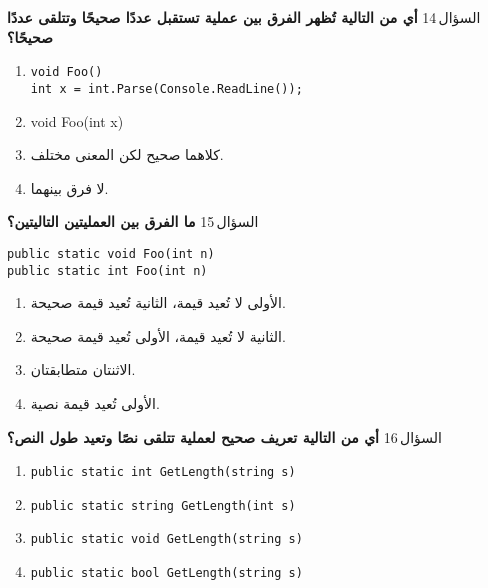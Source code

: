 \documentclass[13pt]{beamer}
\begin{document}
\begin{frame}[fragile]{السؤال\,14}
\textbf{أي من التالية تُظهر الفرق بين عملية \textbf{تستقبل} عددًا صحيحًا و\textbf{تتلقى} عددًا صحيحًا؟}

\begin{enumerate}[label=(\alph*)]
  \item
  \begin{english}
    \begin{lstlisting}[language=CSharp]
void Foo()
int x = int.Parse(Console.ReadLine());
    \end{lstlisting}
  \end{english}
  \item \textenglish{void Foo(int x)}
  \item كلاهما صحيح لكن المعنى مختلف.
  \item لا فرق بينهما.
\end{enumerate}
\end{frame}

\begin{frame}[fragile]{السؤال\,15}
\textbf{ما الفرق بين العمليتين التاليتين؟}

\begin{english}
\begin{lstlisting}[language=CSharp]
public static void Foo(int n)
public static int Foo(int n)
\end{lstlisting}
\end{english}

\begin{enumerate}[label=(\alph*)]
  \item الأولى لا تُعيد قيمة، الثانية تُعيد قيمة صحيحة.
  \item الثانية لا تُعيد قيمة، الأولى تُعيد قيمة صحيحة.
  \item الاثنتان متطابقتان.
  \item الأولى تُعيد قيمة نصية.
\end{enumerate}
\end{frame}

\begin{frame}[fragile]{السؤال\,16}
\textbf{أي من التالية تعريف صحيح لعملية تتلقى نصًا وتعيد طول النص؟}

\begin{english}
\begin{enumerate}[label=(\alph*)]
  \item \texttt{public static int GetLength(string s)}
  \item \texttt{public static string GetLength(int s)}
  \item \texttt{public static void GetLength(string s)}
  \item \texttt{public static bool GetLength(string s)}
\end{enumerate}
\end{english}
\end{frame}
\end{document}
